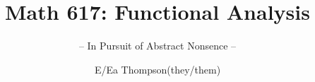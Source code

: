 \documentclass[graybox,envcountchap,sectrefs]{style/svmono}
\begin{document}
\author{E/Ea Thompson(they/them)}
\title{Math 617: Functional Analysis}
\subtitle{-- In Pursuit of Abstract Nonsence --}
\maketitle

\frontmatter%

% 
% 

% 

\tableofcontents




\mainmatter%
%




\backmatter%
% 
% 
% 
\printindex

\end{document}
